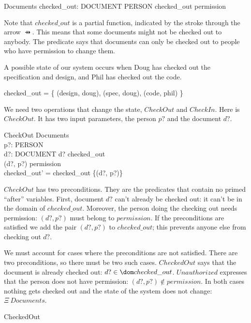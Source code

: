 \begin{schema}{Documents}
	checked\_out: DOCUMENT \pfun PERSON
\where
	checked\_out \subseteq permission
\end{schema}
Note that $checked\_out$ is a partial function, indicated by the stroke
through the arrow $\pfun$.  This means that some documents might not be
checked out to anybody.  The predicate says that documents can only be
checked out to people who have permission to change them.

A possible state of our system occurs when Doug has checked out the
specification and design, and Phil has checked out the code.

\begin{zed} 
	checked\_out = \{ (design, doug), (spec, doug), (code, phil) \}
\end{zed}

We need two operations that change the state, $CheckOut$ and $CheckIn$.
Here is $CheckOut$.  It has two input parameters, the person $p?$ and the document $d?$.

\begin{schema}{CheckOut}
	\Delta Documents \\
	p?: PERSON \\
	d?: DOCUMENT
\where
	d? \notin \dom checked\_out \\
	(d?, p?) \in permission \\
	checked\_out' = checked\_out \cup \{(d?, p?)\}
\end{schema}
$CheckOut$ has two preconditions.  They are the predicates that contain
no primed ``after'' variables.  First, document $d?$ can't already be checked
out: it can't be in the domain of $checked\_out$.  Moreover, the person
doing the checking out needs permission:  $(d?, p?)$ must belong to
$permission$.  If the preconditions are satisfied we add the pair $(d?,p?)$
to $checked\_out$; this prevents anyone else from checking out $d?$.

We must account for cases where the preconditions are not satisfied.
There are two preconditions, so there must be two such cases.
$CheckedOut$ says that the document is already checked out: $d? \in
\dom checked\_out$.  $Unauthorized$ expresses that the person does not 
have permission: $(d?,p?) \notin permission$.  In both cases nothing
gets checked out and the state of the system does not change:
$\Xi~Documents$.

\begin{zed}
CheckedOut 
\end{zed}

